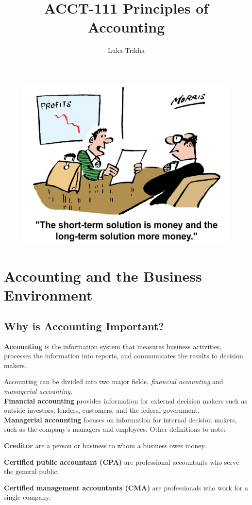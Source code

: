 \documentclass[a4paper, 12pt]{article}
\begin{document}
\title{ACCT-111 Principles of Accounting} \author{Luka Trikha}
\maketitle
\begin{figure}[h]
    \centering
    \includegraphics{cartoon.jpg}
\end{figure}
\newpage

\tableofcontents
\newpage

\section{Accounting and the Business Environment}
\subsection{Why is Accounting Important?}
\textbf{Accounting} is the information system that measures business activities,
processes the information into reports, and communicates the results to decision
makers.

Accounting can be divided into two major fields, \textit{financial accounting}
and \textit{managerial accounting}.\\[2mm]
\textbf{Financial accounting} provides information for external decision makers
such as outside investors, lenders, customers, and the federal government.\\[2mm]
\textbf{Managerial accounting} focuses on information for internal decision
makers, such as the company's managers and employees.
Other definitions to note:
\begin{compactitem}
    \item \textbf{Creditor} are a person or business to whom a business owes
        money.
    \item \textbf{Certified public accountant (CPA)} are professional accountants
        who serve the general public.
    \item \textbf{Certified management accountants (CMA)} are professionals who
        work for a single company.
\end{compactitem}
\end{document}
